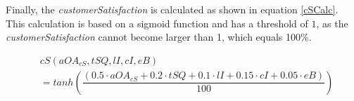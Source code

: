 Finally, the \textit{customerSatisfaction} is calculated as shown in equation \ref{cSCalc}. This calculation is based on a sigmoid function and has a threshold of $1$, as the \textit{customerSatisfaction} cannot become larger than 1, which equals 100\%.

\begin{equation}
\begin{aligned}
\label{cSCalc}
    & cS(aOA_{cS}, tSQ, lI, cI, eB) \\
    & = tanh(\dfrac{(0.5 \cdot aOA_{cS} + 0.2 \cdot tSQ + 0.1 \cdot lI + 0.15 \cdot cI + 0.05 \cdot eB)}{100})
\end{aligned}   
\end{equation}



\begin{comment}
Moreover, there are three main levels of customer requirements regarding products: Must haves, satisfiers and delighters. \cite{krienke_messung_2009}
Must haves are the bare minimum requirements expected of customers. The customers do not show exceptional appreciation for the must haves, but if they are not met, the customer will show dissatisfaction. Satisfiers are the requirements that the customer expressly wishes. If you offer better or more of these satisfiers, then the customers will appreciate it more and be more satisfied. Delighters are the extras or the add-ons. The lack of these characteristics will not make the customer dissatisfied but adding these would greatly increase the customer's satisfaction. In our game, these three levels of customer requirements are included by the following calculation of the customer satisfaction, which depends on a product's \textit{totalProductQuality}. This means, if the user chooses newer, better components for producing a product, then the product's \textit{totalProductQuality} will increase, which again influences the calculation of the customer satisfaction.
    \begin{equation}
    \label{cS_Calc}
    \begin{aligned}
    If \; tPQ \leq \ 40: (0,6*tPQ + 0,15*tSQ + 0,1*lI + 0,1*cI + 0,05*eB)\\
    ElseIf \; tPQ \leq \ 60: (0,5*tPQ + 0,2*tSQ + 0,1*lI + 0,15*cI + 0,05*eB)\\
    Else: (0,45*tPQ + 0,25*tSQ + 0,1*lI + 0,15*cI + 0,05*eB)
    \end{aligned}
    \end{equation}
Each line of the calculation \ref{cS_Calc} refers to one of the three main levels of customer requirements. So, the first line of the calculation refers to a product's must haves, the second line refers to satisfiers and the third line refers to the delighters level of the customer requirements.
Although the calculation \ref{cS_Calc} looks quite static, this is not the case as the variables, on which the calculation is based, are not static but change continuously.
\end{comment}
